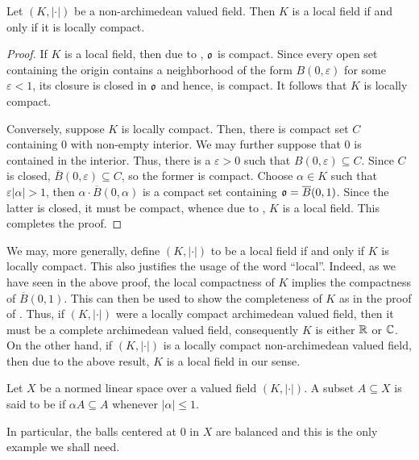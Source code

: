 \begin{corollary}
    Let $(K, |\cdot|)$ be a non-archimedean valued field. Then $K$ is a local field if and only if it is locally compact.
\end{corollary}
\begin{proof}
    If $K$ is a local field, then due to , $\mathfrak{o}$ is compact. Since every open set containing the origin contains a neighborhood of the form $B(0, \varepsilon)$ for some $\varepsilon < 1$, its closure is closed in $\mathfrak{o}$ and hence, is compact. It follows that $K$ is locally compact. 

    Conversely, suppose $K$ is locally compact. Then, there is compact set $C$ containing $0$ with non-empty interior. We may further suppose that $0$ is contained in the interior. Thus, there is a $\varepsilon > 0$ such that $B(0,\varepsilon)\subseteq C$. Since $C$ is closed, $\overline B(0,\varepsilon)\subseteq C$, so the former is compact. Choose $\alpha\in K$ such that $\varepsilon |\alpha| > 1$, then $\alpha\cdot\overline B(0,\alpha)$ is a compact set containing $\mathfrak{o} = \overline B(0, 1)$. Since the latter is closed, it must be compact, whence due to , $K$ is a local field. This completes the proof.
\end{proof}

\begin{remark}
    We may, more generally, define $(K, |\cdot|)$ to be a local field if and only if $K$ is locally compact. This also justifies the usage of the word ``local''. Indeed, as we have seen in the above proof, the local compactness of $K$ implies the compactness of $\overline B(0, 1)$. This can then be used to show the completeness of $K$ as in the proof of . Thus, if $(K, |\cdot|)$ were a locally compact archimedean valued field, then it must be a complete archimedean valued field, consequently $K$ is either $\mathbb{R}$ or $\mathbb{C}$. On the other hand, if $(K, |\cdot|)$ is a locally compact non-archimedean valued field, then due to the above result, $K$ is a local field in our sense.
\end{remark}

\begin{definition}
    Let $X$ be a normed linear space over a valued field $(K, |\cdot|)$. A subset $A\subseteq X$ is said to be  if $\alpha A\subseteq A$ whenever $|\alpha|\le 1$.
\end{definition}

In particular, the balls centered at $0$ in $X$ are balanced and this is the only example we shall need.

